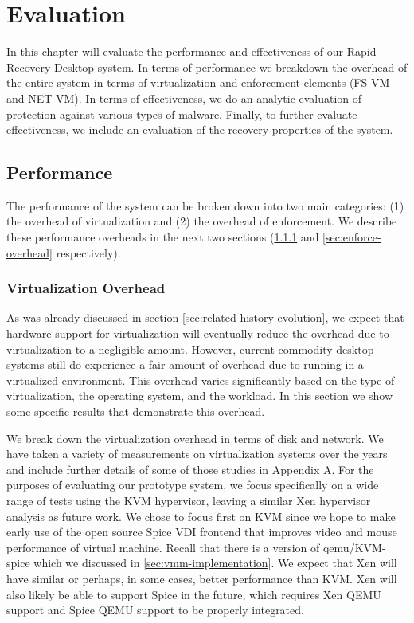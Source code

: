 \chapter{Evaluation} 

In this chapter will evaluate the performance and effectiveness of our Rapid Recovery Desktop system. In terms of performance we breakdown the overhead of the entire system in terms of  virtualization and enforcement elements (FS-VM and NET-VM). In terms of effectiveness, we do an analytic evaluation of protection against various types of malware. Finally, to further evaluate effectiveness, we include an evaluation of the recovery properties of the system.

\section{Performance}

The performance of the system can be broken down into two main categories: (1) the overhead of virtualization and (2) the overhead of enforcement. We describe these performance overheads in the next two sections (\ref{sec:virt-overhead} and \ref{sec:enforce-overhead} respectively).

\subsection{Virtualization Overhead}
\label{sec:virt-overhead}

As was already discussed in section \ref{sec:related-history-evolution}, we expect that hardware support for virtualization will eventually reduce the overhead due to virtualization to a negligible amount. However, current commodity desktop systems still do experience a fair amount of overhead due to running in a virtualized environment. This overhead varies significantly based on the type of virtualization, the operating system, and the workload. In this section we show some specific results that demonstrate this overhead.

We break down the virtualization overhead in terms of disk and network. We have taken a variety of measurements on virtualization systems over the years and include further details of some of those studies in Appendix A. For the purposes of evaluating our prototype system, we focus specifically on a wide range of tests using the KVM hypervisor, leaving a similar Xen hypervisor analysis as future work. We chose to focus first on KVM since we hope to make early use of the open source Spice VDI frontend that improves video and mouse performance of virtual machine. Recall that there is a version of qemu/KVM-spice which we discussed in \ref{sec:vmm-implementation}. We expect that Xen will have similar or perhaps, in some cases, better performance than KVM. Xen will also likely be able to support Spice in the future, which requires Xen QEMU support and Spice QEMU support to be properly integrated.

